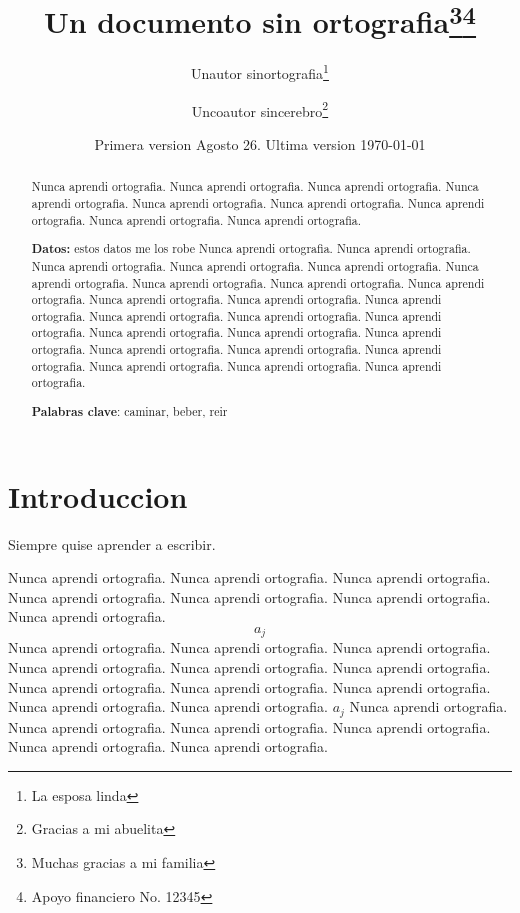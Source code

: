 \documentclass[13pt]{article}
\begin{document}
    \title{Un documento sin ortografia\thanks{Muchas gracias a mi familia}\thanks{Apoyo financiero No. 12345}}
    \author{Unautor sinortografia\thanks{La esposa linda} \and Uncoautor sincerebro\thanks{Gracias a mi abuelita}}
    \date{Primera version Agosto 26. Ultima version \today}
    \maketitle

    \begin{abstract}
        Nunca aprendi ortografia. Nunca aprendi ortografia. Nunca aprendi ortografia.
        Nunca aprendi ortografia. Nunca aprendi ortografia. Nunca aprendi ortografia.
        Nunca aprendi ortografia. Nunca aprendi ortografia. Nunca aprendi ortografia.

        \textbf{Datos:} estos datos me los robe
        Nunca aprendi ortografia. Nunca aprendi ortografia. Nunca aprendi ortografia.
        Nunca aprendi ortografia. Nunca aprendi ortografia. Nunca aprendi ortografia.
        Nunca aprendi ortografia. Nunca aprendi ortografia. Nunca aprendi ortografia.
        Nunca aprendi ortografia. Nunca aprendi ortografia. Nunca aprendi ortografia.
        Nunca aprendi ortografia. Nunca aprendi ortografia. Nunca aprendi ortografia.
        Nunca aprendi ortografia. Nunca aprendi ortografia. Nunca aprendi ortografia.
        Nunca aprendi ortografia. Nunca aprendi ortografia. Nunca aprendi ortografia.
        Nunca aprendi ortografia. Nunca aprendi ortografia. Nunca aprendi ortografia.

	\noindent \textbf{Palabras clave}: caminar, beber, reir
    \end{abstract}

    \section{Introduccion}\label{sec.intro}
        Siempre quise aprender a escribir.


        Nunca aprendi ortografia. Nunca aprendi ortografia. Nunca aprendi ortografia.
        Nunca aprendi ortografia. Nunca aprendi ortografia. Nunca aprendi ortografia.
        Nunca aprendi ortografia. $$a_j$$  Nunca aprendi ortografia. Nunca aprendi ortografia.
        Nunca aprendi ortografia. Nunca aprendi ortografia. Nunca aprendi ortografia.
        Nunca aprendi ortografia. Nunca aprendi ortografia. Nunca aprendi ortografia.
        Nunca aprendi ortografia. Nunca aprendi ortografia. Nunca aprendi ortografia. $a_j$
        Nunca aprendi ortografia. Nunca aprendi ortografia. Nunca aprendi ortografia.
        Nunca aprendi ortografia. Nunca aprendi ortografia. Nunca aprendi ortografia.
\end{document}
